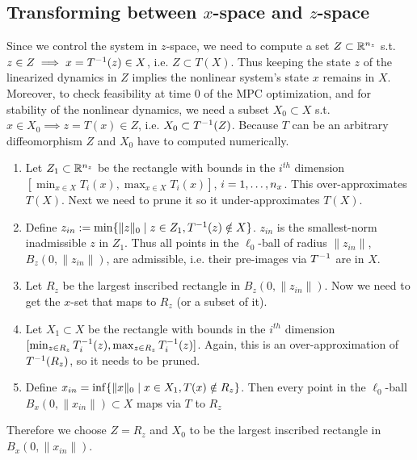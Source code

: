\subsection{Transforming between $x$-space and $z$-space}
\label{sec:transforming x to z}
Since we control the system in $z$-space, we need to compute a set $Z \subset \mathbb{R}^{n_z}$ s.t. $z \in Z \implies x = T^{-1}(z) \in X$, i.e. $Z \subset T(X)$.
Thus keeping the state $z$ of the linearized dynamics in $Z$ implies the nonlinear system's state $x$ remains in $X$.
Moreover, to check feasibility at time 0 of the MPC optimization, and for stability of the nonlinear dynamics, we need a subset $X_0 \subset X$ s.t. $x \in X_0 \implies z = T(x) \in Z$, i.e. $X_0 \subset T^{-1}(Z)$.
Because $T$ can be an arbitrary diffeomorphism $Z$ and $X_0$ have to computed numerically.
\begin{enumerate}
	\item Let $Z_1 \subset \mathbb{R}^{n_z}$ be the rectangle with bounds in the $i^{th}$ dimension $[ \min_{x \in X} T_i(x),  \max_{x \in X} T_i(x) ]$, $i=1,\ldots, n_x$.
	This over-approximates $T(X)$. 
	Next we need to prune it so it under-approximates $T(X)$. 
	\item Define $z_{in} := \min \{ \|z \|_0 \;|\; z \in Z_1, T^{-1}(z) \notin X\}$.
	$z_{in}$ is the smallest-norm inadmissible $z$ in $Z_1$.
	Thus all points in the $\ell_0$-ball of radius $\|z_{in}\|$,$B_z(0,\|z_{in}\|)$, are admissible, i.e. their pre-images via $T^{-1}$ are in $X$.
	\item Let $R_z$ be the largest inscribed rectangle in $B_z(0,\|z_{in}\|)$.
	Now we need to get the $x$-set that maps to $R_z$  (or a subset of it).
	\item Let $X_1 \subset X$ be the rectangle with bounds in the $i^{th}$ dimension $[\min_{z \in R_{z}} T^{-1}_i(z),  \max_{z \in R_{z}} T^{-1}_i(z) ]$.
	Again, this is an over-approximation of $T^{-1}(R_{z})$, so it needs to be pruned.
	\item Define $x_{in} = \inf \{\|x\|_0 \;|\; x \in X_1, T(x) \notin R_{z}\}$.
	Then every point in the $\ell_0$-ball $B_x(0, \|x_{in}\|) \subset X$ maps via $T$ to $R_{z}$
\end{enumerate}
Therefore we choose $Z = R_z$ and $X_0$ to be the largest inscribed rectangle in $B_x(0,  \|x_{in}\|)$.


